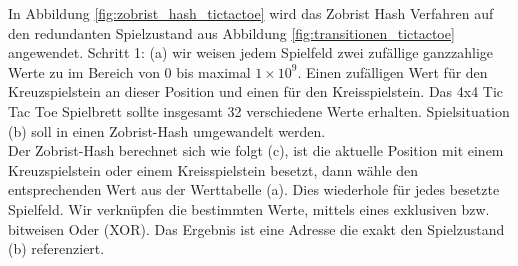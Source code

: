In Abbildung \ref{fig:zobrist_hash_tictactoe} wird das Zobrist Hash Verfahren auf den redundanten Spielzustand aus Abbildung \ref{fig:transitionen_tictactoe} angewendet. Schritt 1: (a) wir weisen jedem Spielfeld zwei zufällige ganzzahlige Werte zu im Bereich von 0 bis maximal $1 \times 10^{9}$. Einen zufälligen Wert für den Kreuzspielstein an dieser Position und einen für den Kreisspielstein. Das 4x4 Tic Tac Toe Spielbrett sollte insgesamt 32 verschiedene Werte erhalten. Spielsituation (b) soll in einen Zobrist-Hash umgewandelt werden. \\

Der Zobrist-Hash berechnet sich wie folgt (c), ist die aktuelle Position mit einem Kreuzspielstein oder einem Kreisspielstein besetzt, dann wähle den entsprechenden Wert aus der Werttabelle (a). Dies wiederhole für jedes besetzte Spielfeld. Wir verknüpfen die bestimmten Werte, mittels eines exklusiven bzw. bitweisen Oder (XOR). Das Ergebnis ist eine Adresse die exakt den Spielzustand (b) referenziert. \\

